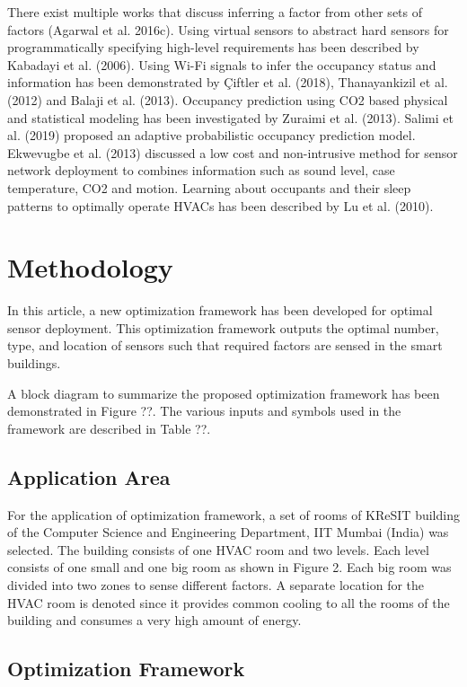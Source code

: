 \documentclass[]{interact}
\theoremstyle{plain}%
\theoremstyle{definition}
\theoremstyle{remark}
\begin{document}
There exist multiple works that discuss inferring a factor from other sets of factors (Agarwal et al. 2016c). Using virtual sensors to abstract hard sensors for programmatically specifying high-level requirements has been described by Kabadayi et al. (2006). Using Wi-Fi signals to infer the occupancy status and information has been demonstrated by Çiftler et al. (2018), Thanayankizil et al. (2012) and Balaji et al. (2013). Occupancy prediction using CO2 based physical and statistical modeling has been investigated by Zuraimi et al. (2013). Salimi et al. (2019) proposed an adaptive probabilistic occupancy prediction model. Ekwevugbe et al. (2013) discussed a low cost and non-intrusive method for sensor network deployment to combines information such as sound level, case temperature, CO2 and motion. Learning about occupants and their sleep patterns to optimally operate HVACs has been described by Lu et al. (2010). 


\section{Methodology}

In this article, a new optimization framework has been developed for optimal sensor deployment. This optimization framework outputs the optimal number, type, and location of sensors such that required factors are sensed in the smart buildings. 


A block diagram to summarize the proposed optimization framework has been demonstrated in Figure ??. The various inputs and symbols used in the framework are described in Table ??.





\subsection{Application Area}

For the application of optimization framework, a set of rooms of KReSIT building of the Computer Science and Engineering Department, IIT Mumbai (India) was selected. The building consists of one HVAC room and two levels. Each level consists of one small and one big room as shown in Figure 2. Each big room was divided into two zones to sense different factors. A separate location for the HVAC room is denoted since it provides common cooling to all the rooms of the building and consumes a very high amount of energy. 


\subsection{Optimization Framework}
\end{document}
